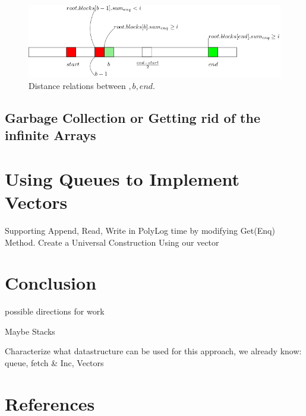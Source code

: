 \documentclass[10pt]{article}
\newcommand{\nf}[1]{{\normalfont{\texttt{#1}}}}
\theoremstyle{definition}
\begin{document}
\begin{figure}[hbt]  
  \center\includegraphics[width=6in]{pics/doubling.png}
  \caption{Distance relations between \nf{start}$,b,end$.}
  \label{fig::doubling}
\end{figure}

\pagebreak
\subsection{Garbage Collection or Getting rid of the infinite Arrays}

\pagebreak
\section{Using Queues to Implement Vectors}
Supporting Append, Read, Write in PolyLog time by modifying Get(Enq) Method. Create a Universal Construction Using our vector

\pagebreak
\section{Conclusion}
possible directions for work

Maybe Stacks

Characterize what datastructure can be used for this approach, we already know: queue, fetch \& Inc, Vectors

\section*{References}
 

\end{document}
